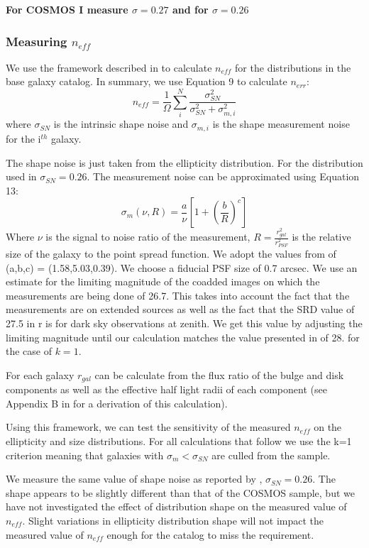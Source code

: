 \documentclass[]{article}
\begin{document}
{\bf For COSMOS I measure $\sigma=0.27$ and for $\sigma=0.26$}

\subsubsection{Measuring $n_{eff}$}
We use the framework described in \cite{chang} to calculate $n_{eff}$ for the distributions in the 
base galaxy catalog.  In summary, we use Equation 9 to calculate $n_{err}$:
\begin{equation}
n_{eff} = \frac{1}{\Omega}\sum^N_i\frac{\sigma^2_{SN}}{\sigma^2_{SN}+\sigma^2_{m,i}}
\end{equation}
where $\sigma_{SN}$ is the intrinsic shape noise and $\sigma_{m,i}$ is the shape measurement noise for the i$^{th}$ galaxy.

The shape noise is just taken from the ellipticity distribution.  For the distribution used in \cite{chang} $\sigma_{SN} = 0.26$.
The measurement noise can be approximated using Equation 13:
\begin{equation}
\sigma_m(\nu,R) = \frac{a}{\nu}\left[1+\left(\frac{b}{R}\right)^c\right]
\end{equation}
Where $\nu$ is the signal to noise ratio of the measurement, $R=\frac{r_{gal}^2}{r_{PSF}^2}$ is the relative size of the galaxy to
the point spread function.  We adopt the values from \cite{chang} of (a,b,c) = (1.58,5.03,0.39).  We choose a fiducial
PSF size of 0.7 arcsec. We use an estimate for the limiting magnitude of the coadded images on which the measurements are being
done of 26.7.  This takes into account the fact that the measurements are on extended sources as well as the fact that the SRD value 
of 27.5 in r is for dark sky observations at zenith.  We get this value by adjusting the limiting magnitude until our calculation
matches the value presented in \cite{chang} of 28. for the case of $k=1$.

For each galaxy $r_{gal}$ can be calculate from the flux ratio of the bulge and disk components as well as the effective half light 
radii of each component (see Appendix B in \cite{chang} for a derivation of this calculation).

Using this framework, we can test the sensitivity of the measured $n_{eff}$ on the ellipticity and size distributions.  For all calculations that follow we 
use the k=1 criterion meaning that galaxies with $\sigma_m < \sigma_{SN}$ are culled from the sample.

We measure the same value of shape noise as reported by \cite{change}, $\sigma_{SN} = 0.26$.  The shape appears to be slightly different than
that of the COSMOS sample, but we have not investigated the effect of distribution shape on the measured value of $n_{eff}$.  Slight variations in
ellipticity distribution shape will not impact the measured value of $n_{eff}$ enough for the catalog to miss the requirement.
\end{document}
